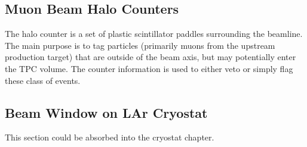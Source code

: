 \subsection{Muon Beam Halo Counters}
The halo counter is a set of plastic scintillator paddles surrounding the beamline. The main purpose is to tag particles (primarily muons from the upstream production target) that are outside of the beam axis, but may potentially enter the TPC volume. The counter information is used to either veto or simply flag these class of events.

\subsection{Beam Window on LAr Cryostat}
This section could be absorbed into the cryostat chapter.
